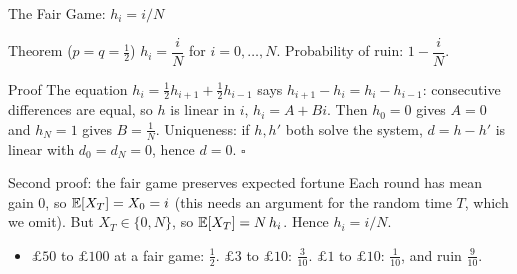 \begin{frame}{The Fair Game: $h_i=i/N$}
  \label{fr:ruinfair}
  \small
  \begin{block}{Theorem ($p=q=\tfrac12$)}
    $h_i=\dfrac iN$ for $i=0,\dots,N$. \quad Probability of ruin: $1-\dfrac iN$.
  \end{block}
  \begin{block}{Proof}
    The equation $h_i=\tfrac12h_{i+1}+\tfrac12h_{i-1}$ says $h_{i+1}-h_i=h_i-h_{i-1}$: consecutive differences are equal, so $h$ is linear in $i$, $h_i=A+Bi$. Then $h_0=0$ gives $A=0$ and $h_N=1$ gives $B=\tfrac1N$.
    Uniqueness: if $h,h'$ both solve the system, $d=h-h'$ is linear with $d_0=d_N=0$, hence $d=0$. \hfill$\square$
  \end{block}
  \begin{block}{Second proof: the fair game preserves expected fortune}
    Each round has mean gain $0$, so $\mathbb{E}[X_T]=X_0=i$ (this needs an argument for the random time $T$, which we omit). But $X_T\in\{0,N\}$, so $\mathbb{E}[X_T]=N\,h_i$. Hence $h_i=i/N$.
  \end{block}
  \begin{itemize}
    \item $\pounds50$ to $\pounds100$ at a fair game: $\tfrac12$. $\pounds3$ to $\pounds10$: $\tfrac3{10}$. $\pounds1$ to $\pounds10$: $\tfrac1{10}$, and ruin $\tfrac9{10}$.
  \end{itemize}
\end{frame}

